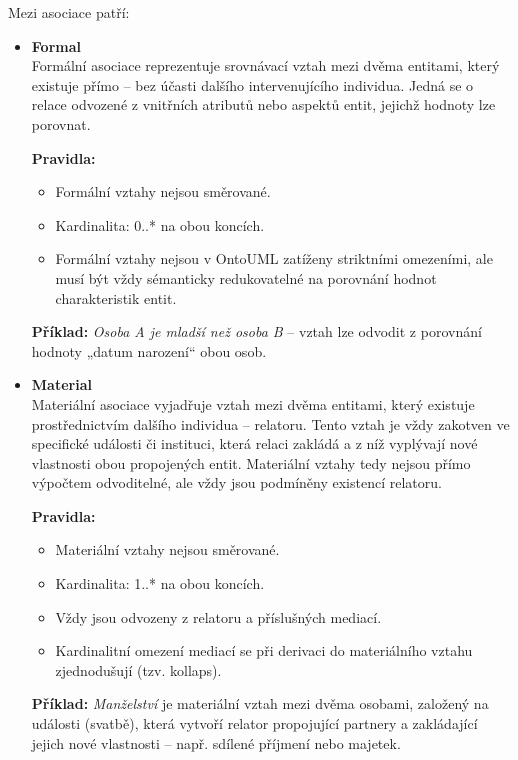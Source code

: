 \vspace{1em}
\noindent Mezi asociace patří:
\begin{itemize}
  \item \textbf{Formal} \\
  Formální asociace reprezentuje srovnávací vztah mezi dvěma entitami, který existuje přímo – bez účasti dalšího intervenujícího individua. Jedná se o relace odvozené z vnitřních atributů nebo aspektů entit, jejichž hodnoty lze porovnat. \cite{KOM_prezentace3,ontouml_relations}

  \textbf{Pravidla:}
  \begin{itemize}
    \item Formální vztahy nejsou směrované.
    \item Kardinalita: 0..* na obou koncích.
    \item Formální vztahy nejsou v OntoUML zatíženy striktními omezeními, ale musí být vždy sémanticky redukovatelné na porovnání hodnot charakteristik entit.
  \end{itemize}

  \textbf{Příklad:} \textit{Osoba A je mladší než osoba B} – vztah lze odvodit z porovnání hodnoty „datum narození“ obou osob. 


  \item \textbf{Material} \\
  Materiální asociace vyjadřuje vztah mezi dvěma entitami, který existuje prostřednictvím dalšího individua – relatoru. Tento vztah je vždy zakotven ve specifické události či instituci, která relaci zakládá a z níž vyplývají nové vlastnosti obou propojených entit. Materiální vztahy tedy nejsou přímo výpočtem odvoditelné, ale vždy jsou podmíněny existencí relatoru. \cite{KOM_prezentace3,ontouml_relations}

  \textbf{Pravidla:}
  \begin{itemize}
    \item Materiální vztahy nejsou směrované.
    \item Kardinalita: 1..* na obou koncích.
    \item Vždy jsou odvozeny z relatoru a příslušných mediací.
    \item Kardinalitní omezení mediací se při derivaci do materiálního vztahu zjednodušují (tzv. kollaps). \cite{ontouml_relations}
  \end{itemize}

  \textbf{Příklad:} \textit{Manželství} je materiální vztah mezi dvěma osobami, založený na události (svatbě), která vytvoří relator propojující partnery a zakládající jejich nové vlastnosti – např. sdílené příjmení nebo majetek. 



\end{itemize}
